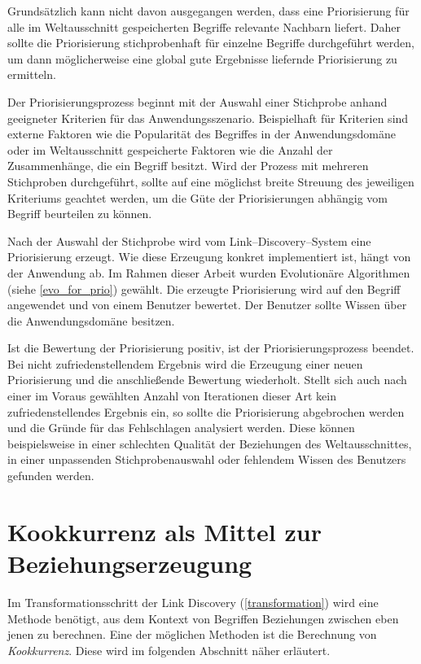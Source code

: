 Grundsätzlich kann nicht davon ausgegangen werden, dass eine Priorisierung für alle im Weltausschnitt gespeicherten Begriffe relevante Nachbarn liefert. Daher sollte die Priorisierung stichprobenhaft für einzelne Begriffe durchgeführt werden, um dann möglicherweise eine global gute Ergebnisse liefernde Priorisierung zu ermitteln.

Der Priorisierungsprozess beginnt mit der Auswahl einer Stichprobe anhand geeigneter Kriterien für das Anwendungsszenario. Beispielhaft für Kriterien sind externe Faktoren wie die Popularität des Begriffes in der Anwendungsdomäne oder im Weltausschnitt gespeicherte Faktoren wie die Anzahl der Zusammenhänge, die ein Begriff besitzt. Wird der Prozess mit mehreren Stichproben durchgeführt, sollte auf eine möglichst breite Streuung des jeweiligen Kriteriums geachtet werden, um die Güte der Priorisierungen abhängig vom Begriff beurteilen zu können.

Nach der Auswahl der Stichprobe wird vom Link--Discovery--System eine Priorisierung erzeugt. Wie diese Erzeugung konkret implementiert ist, hängt von der Anwendung ab. Im Rahmen dieser Arbeit wurden Evolutionäre Algorithmen (siehe \cref{evo_for_prio}) gewählt. Die erzeugte Priorisierung wird auf den Begriff angewendet und von einem Benutzer bewertet. Der Benutzer sollte Wissen über die Anwendungsdomäne besitzen.

Ist die Bewertung der Priorisierung positiv, ist der Priorisierungsprozess beendet. Bei nicht zufriedenstellendem Ergebnis wird die Erzeugung einer neuen Priorisierung und die anschließende Bewertung wiederholt. Stellt sich auch nach einer im Voraus gewählten Anzahl von Iterationen dieser Art kein zufriedenstellendes Ergebnis ein, so sollte die Priorisierung abgebrochen werden und die Gründe für das Fehlschlagen analysiert werden. Diese können beispielsweise in einer schlechten Qualität der Beziehungen des Weltausschnittes, in einer unpassenden Stichprobenauswahl oder fehlendem Wissen des Benutzers gefunden werden.

\section{Kookkurrenz als Mittel zur Beziehungserzeugung}
\label{co-occurence}

Im Transformationsschritt der Link Discovery (\cref{transformation}) wird eine Methode benötigt, aus dem Kontext von Begriffen Beziehungen zwischen eben jenen zu berechnen. Eine der möglichen Methoden ist die Berechnung von \emph{Kookkurrenz}. Diese wird im folgenden Abschnitt näher erläutert.

